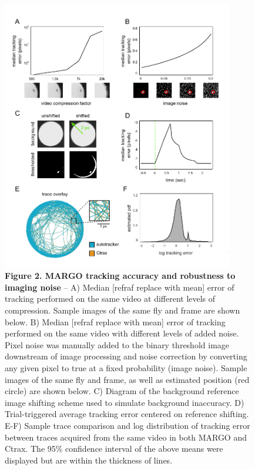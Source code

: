 \documentclass[10pt]{article}
\begin{document}
\newpage
\begin{figure}[h!]
	\begin{center}
		\includegraphics[width=0.9\textwidth]{../figures/autotracker_performance.pdf}
	\end{center}
	\caption*{\footnotesize \textbf{Figure 2. MARGO tracking accuracy and robustness to imaging noise} -- A) Median [refraf replace with mean] error of tracking performed on the same video at different levels of compression. Sample images of the same fly and frame are shown below. B) Median [refraf replace with mean] error of tracking performed on the same video with different levels of added noise. Pixel noise was manually added to the binary threshold image downstream of image processing and noise correction by converting any given pixel to true at a fixed probability (image noise). Sample images of the same fly and frame, as well as estimated position (red circle) are shown below. C) Diagram of the background reference image shifting scheme used to simulate background inaccuracy. D) Trial-triggered average tracking error centered on reference shifting. E-F) Sample trace comparison and log distribution of tracking error between traces acquired from the same video in both MARGO and Ctrax. The 95\% confidence interval of the above means were displayed but are within the thickness of lines.}
\end{figure}
\end{document}
